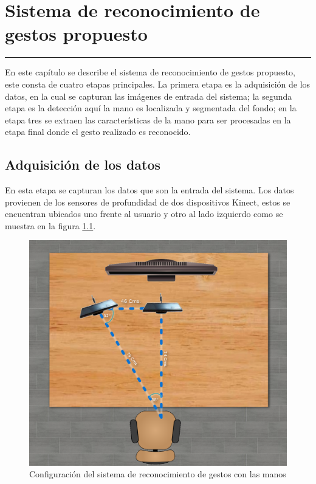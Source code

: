 \chapter{Sistema de reconocimiento de gestos propuesto}\label{capit:cap3}
\vspace{-2.0325ex}%
\noindent
\rule{\textwidth}{0.5pt}
\vspace{-5.5ex}%
\newcommand{\pushline}{\Indp}%

En este cap\'itulo se describe el sistema de reconocimiento de gestos propuesto, este consta de cuatro etapas principales. La primera etapa es la adquisición de los datos, en la cual se capturan las imágenes de entrada del sistema; la segunda etapa es la detección aquí la mano es localizada y segmentada del fondo; en la etapa tres se extraen las características de la mano para ser procesadas en la etapa final donde el gesto realizado es reconocido. 

\section{Adquisición de los datos}\label{sec:AdquisicionDatos}

En esta etapa se capturan los datos que son la entrada del sistema. Los datos provienen de los sensores de profundidad de dos dispositivos Kinect, estos se encuentran ubicados uno frente al  usuario y otro al lado  izquierdo como se muestra en la figura \ref{fig:SetupSystem}.

\begin{figure}[!h]
\begin{center}
\includegraphics[scale=.2]{./Figures/system.png}
\end{center}
\caption{Configuración del sistema de reconocimiento de gestos con las manos}
\label{fig:SetupSystem}
\end{figure} 
 
